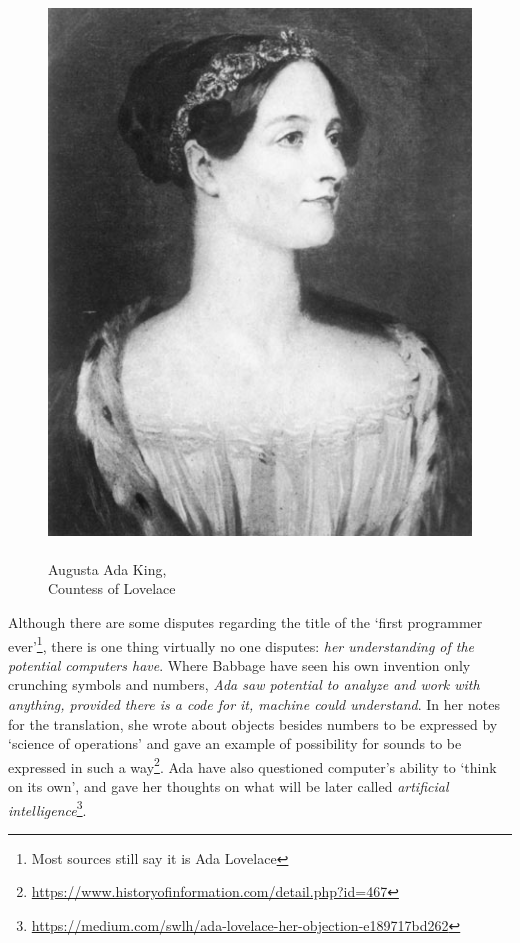 \documentclass[../../what-is-computer]{subfiles}
\begin{document}


    \begin{figure}
        \centering
        \includegraphics[scale=0.2]{images/persons/person_ada_lovelace.jpg}
        \caption{\\Augusta Ada King, \\ Countess of Lovelace}
    \end{figure}

    Although there are some disputes regarding the title of the `first programmer ever'\footnote{Most sources still say it is Ada Lovelace}, there is one thing virtually
    no one disputes: \emph{her understanding of the potential computers have}. Where Babbage have seen his own invention only crunching symbols and numbers, \emph{Ada saw
    potential to analyze and work with anything, provided there is a code for it, machine could understand}. In her notes for the translation, she wrote about objects besides
    numbers to be expressed by `science of operations' and gave an example of possibility for sounds to be expressed in such a way\footnote{\href{https://www.historyofinformation.com/detail.php?id=467}
    {https://www.historyofinformation.com/detail.php?id=467}}. Ada have also questioned computer's ability to `think on its own', and gave her thoughts on what will be later
    called \emph{artificial intelligence}\footnote{\href{https://medium.com/swlh/ada-lovelace-her-objection-e189717bd262}{https://medium.com/swlh/ada-lovelace-her-objection-e189717bd262}}.\par
\end{document}
